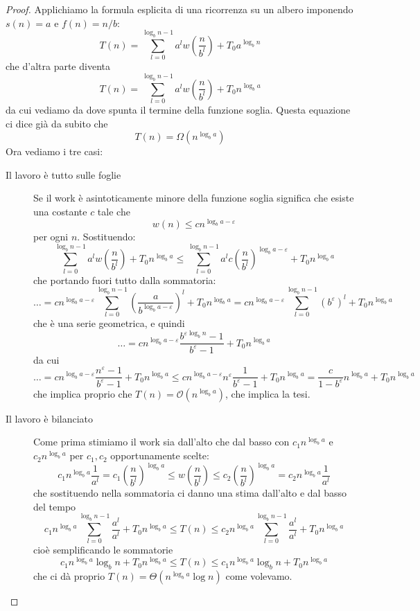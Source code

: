 \documentclass[11pt]{scrartcl}
\newcommand{\bigo}[1]{\mathcal{O}\!\left(#1\right)}
\newcommand{\bigomega}[1]{\Omega\!\left(#1\right)}
\newcommand{\bigtheta}[1]{\Theta\!\left(#1\right)}
\begin{document}
	\begin{proof}
		Applichiamo la formula esplicita di una ricorrenza su un albero imponendo $s(n)=a$ e $f(n)=n/b$:
		$$T(n)=\sum_{l=0}^{\log_b n -1}a^l w\left(\frac{n}{b^l}\right) + T_0 a^{\log_b n}$$
		che d'altra parte diventa
		$$T(n)=\sum_{l=0}^{\log_b n -1}a^l w\left(\frac{n}{b^l}\right) + T_0 n^{\log_b a}$$
		da cui vediamo da dove spunta il termine della funzione soglia. Questa equazione ci dice già da subito che
		$$T(n)=\bigomega{n^{\log_b a}}$$
		Ora vediamo i tre casi:
		\begin{description}
			\item[Il lavoro è tutto sulle foglie] Se il work è asintoticamente minore della funzione soglia significa che esiste una costante $c$ tale che 
			$$w(n)\le c n^{\log_b a -\varepsilon}$$
			per ogni $n$. Sostituendo:
			$$\sum_{l=0}^{\log_b n -1}a^l w\left(\frac{n}{b^l}\right) + T_0 n^{\log_b a} \le \sum_{l=0}^{\log_b n -1}a^l c\left(\frac{n}{b^l}\right)^{\log_b a -\varepsilon} + T_0 n^{\log_b a}$$
			che portando fuori tutto dalla sommatoria:
			$$\dots = c n^{\log_b a -\varepsilon}\sum_{l=0}^{\log_b n -1}\left(\frac{a}{b^{\log_b a -\varepsilon}}\right)^l+T_0 n^{\log_b a}=c n^{\log_b a -\varepsilon}\sum_{l=0}^{\log_b n -1}(b^\varepsilon)^l +  T_0 n^{\log_b a}$$
			che è una serie geometrica, e quindi 
			$$\dots= cn^{\log_b a -\varepsilon}\frac{b^{\varepsilon\log_b n }-1}{b^\varepsilon-1}+T_0 n^{\log_b a}$$
			da cui
			$$\dots = cn^{\log_b a -\varepsilon}\frac{n^\varepsilon-1}{b^\varepsilon-1}+T_0 n^{\log_b a}\le cn^{\log_b a -\varepsilon}n^\varepsilon\frac{1}{b^\varepsilon-1}+T_0 n^{\log_b a}=\frac{c}{1-b^\varepsilon}n^{\log_b a}+T_0 n^{\log_b a}$$
			che implica proprio che $T(n)=\bigo{n^{\log_b a}}$, che implica la tesi.
			\item[Il lavoro è bilanciato] Come prima stimiamo il work sia dall'alto che dal basso con $c_1 n^{\log_b a}$ e $c_2 n^{\log_b a}$ per $c_1,c_2$ opportunamente scelte:
			$$c_1n^{\log_b a}\frac{1}{a^l}=c_1\left(\frac{n}{b^l}\right)^{\log_b a}\le w\left(\frac{n}{b^l}\right)\le c_2\left(\frac{n}{b^l}\right)^{\log_b a}=c_2n^{\log_b a}\frac{1}{a^l}$$
			che sostituendo nella sommatoria ci danno una stima dall'alto e dal basso del tempo
			$$c_1 n^{\log_b a}\sum_{l=0}^{\log_b n-1}\frac{a^l}{a^l}+T_0n^{\log_b a}\le T(n)\le c_2 n^{\log_b a}\sum_{l=0}^{\log_b n-1}\frac{a^l}{a^l}+T_0n^{\log_b a}$$
			cioè semplificando le sommatorie
			$$c_1 n^{\log_b a}\log_b n+T_0n^{\log_b a} \le T(n) \le c_1 n^{\log_b a}\log_b n+T_0n^{\log_b a}$$
			che ci dà proprio $T(n)=\bigtheta{n^{\log_b a}\log n}$ come volevamo.

\end{description}
\end{proof}
\end{document}
